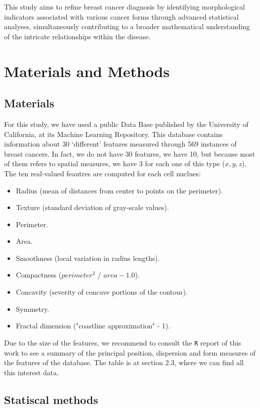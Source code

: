\documentclass[10pt,a4paper]{article}
\theoremstyle{definition}
\theoremstyle{definition}
\begin{document}
This study aims to refine breast cancer diagnosis by identifying morphological indicators associated with various cancer forms through advanced statistical analyses, simultaneously contributing to a broader mathematical understanding of the intricate relationships within the disease.

\newpage

\section{Materials and Methods}
\subsection{Materials}

For this study, we have used a public Data Base published by the University of California, at its Machine Learning Repository. This database contains information about 30 `different' features measured through 569 instances of breast cancers. In fact, we do not have 30 features, we have 10, but because most of them refers to spatial measures, we have 3 for each one of this type (\(x,y,z\)). The ten real-valued feautres are computed for each cell nuclues:

\begin{itemize}
	\item Radius (mean of distances from center to points on the perimeter).
	\item Texture (standard deviation of gray-scale values).
	\item Perimeter.
	\item Area.
	\item Smoothness (local variation in radius lengths).
	\item Compactness (\(perimeter^2\) / \(area - 1.0\)).
	\item Concavity (severity of concave portions of the contour).
	\item Symmetry.
	\item Fractal dimension ("coastline approximation" - 1).
\end{itemize}

Due to the size of the features, we recommend to consult the \texttt{R} report of this work to see a summary of the principal position, dispersion and form measures of the features of the database. The table is at section 2.3, where we can find all this interest data.

\subsection{Statiscal methods}
\end{document}
